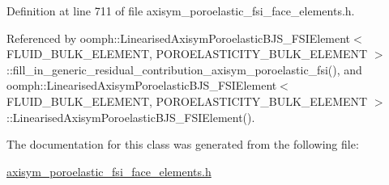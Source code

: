 Definition at line 711 of file axisym\+\_\+poroelastic\+\_\+fsi\+\_\+face\+\_\+elements.\+h.



Referenced by oomph\+::\+Linearised\+Axisym\+Poroelastic\+B\+J\+S\+\_\+\+F\+S\+I\+Element$<$ F\+L\+U\+I\+D\+\_\+\+B\+U\+L\+K\+\_\+\+E\+L\+E\+M\+E\+N\+T, P\+O\+R\+O\+E\+L\+A\+S\+T\+I\+C\+I\+T\+Y\+\_\+\+B\+U\+L\+K\+\_\+\+E\+L\+E\+M\+E\+N\+T $>$\+::fill\+\_\+in\+\_\+generic\+\_\+residual\+\_\+contribution\+\_\+axisym\+\_\+poroelastic\+\_\+fsi(), and oomph\+::\+Linearised\+Axisym\+Poroelastic\+B\+J\+S\+\_\+\+F\+S\+I\+Element$<$ F\+L\+U\+I\+D\+\_\+\+B\+U\+L\+K\+\_\+\+E\+L\+E\+M\+E\+N\+T, P\+O\+R\+O\+E\+L\+A\+S\+T\+I\+C\+I\+T\+Y\+\_\+\+B\+U\+L\+K\+\_\+\+E\+L\+E\+M\+E\+N\+T $>$\+::\+Linearised\+Axisym\+Poroelastic\+B\+J\+S\+\_\+\+F\+S\+I\+Element().



The documentation for this class was generated from the following file\+:\begin{DoxyCompactItemize}
\item 
\hyperlink{axisym__poroelastic__fsi__face__elements_8h}{axisym\+\_\+poroelastic\+\_\+fsi\+\_\+face\+\_\+elements.\+h}\end{DoxyCompactItemize}
